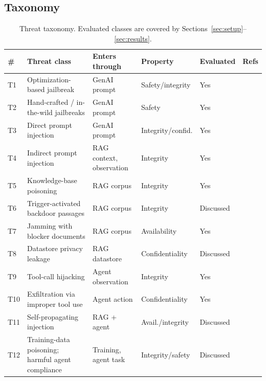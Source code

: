 \documentclass[review,12pt]{elsarticle}
\begin{document}
\subsection{Taxonomy}
\begin{table}[t]\centering\small
\caption{Threat taxonomy. Evaluated classes are covered by Sections~\ref{sec:setup}--\ref{sec:results}.}
\label{tab:taxonomy}
\begin{tabular}{llllll}\toprule
\# & Threat class & Enters through & Property & Evaluated & Refs \\\midrule
T1 & Optimization-based jailbreak & GenAI prompt & Safety/integrity & Yes & \cite{zou2023gcg,mazeika2024harmbench}\\
T2 & Hand-crafted / in-the-wild jailbreaks & GenAI prompt & Safety & Yes & \cite{wei2023jailbroken,shen2024dan}\\
T3 & Direct prompt injection & GenAI prompt & Integrity/confid. & Yes & \cite{liu2023formalizing}\\
T4 & Indirect prompt injection & RAG context, observation & Integrity & Yes & \cite{greshake2023indirect,hines2024spotlighting}\\
T5 & Knowledge-base poisoning & RAG corpus & Integrity & Yes & \cite{zhong2023poisoning,zou2024poisonedrag}\\
T6 & Trigger-activated backdoor passages & RAG corpus & Integrity & Discussed & \cite{chaudhari2024phantom,xue2024badrag}\\
T7 & Jamming with blocker documents & RAG corpus & Availability & Yes & \cite{shafran2024jamming}\\
T8 & Datastore privacy leakage & RAG datastore & Confidentiality & Discussed & \cite{zeng2024goodbad}\\
T9 & Tool-call hijacking & Agent observation & Integrity & Yes & \cite{debenedetti2024agentdojo,zhan2024injecagent}\\
T10 & Exfiltration via improper tool use & Agent action & Confidentiality & Yes & \cite{zhan2024injecagent,fu2024imprompter}\\
T11 & Self-propagating injection & RAG + agent & Avail./integrity & Discussed & \cite{cohen2024worm}\\
T12 & Training-data poisoning; harmful agent compliance & Training, agent task & Integrity/safety & Discussed & \cite{carlini2024poisoning,andriushchenko2024agentharm,ruan2023toolemu,zhang2024asb}\\
\bottomrule\end{tabular}\end{table}
\end{document}

